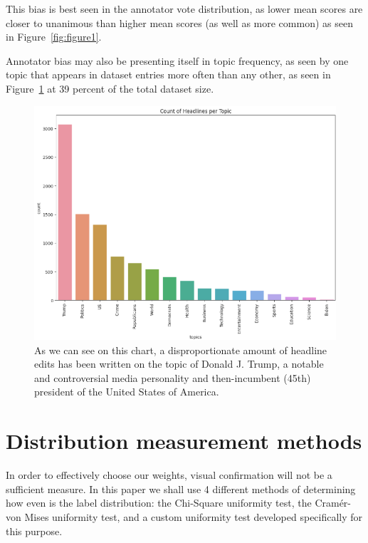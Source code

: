 \documentclass[10pt, a4paper]{article}
\begin{document}
This bias is best seen in the annotator vote distribution, as lower mean scores are closer to unanimous than higher mean scores (as well as more common) as seen in Figure~\ref{fig:figure1}.


Annotator bias may also be presenting itself in topic frequency, as seen by one topic that appears in dataset entries more often than any other, as seen in Figure~\ref{fig:figure2} at 39 percent of the total dataset size.

\begin{figure}
\begin{center}
\includegraphics[width=\columnwidth]{topics_disproportion.pdf}
\caption{As we can see on this chart, a disproportionate amount of headline edits has been written on the topic of Donald J. Trump, a notable and controversial media personality and then-incumbent (45th) president of the United States of America.}
\label{fig:figure2}
\end{center}
\end{figure}



\section{Distribution measurement methods}
In order to effectively choose our weights, visual confirmation will not be a sufficient measure.
In this paper we shall use 4 different methods of determining how even is the label distribution: the Chi-Square uniformity test, the Cramér-von Mises uniformity test, and a custom uniformity test developed specifically for this purpose.
\end{document}
